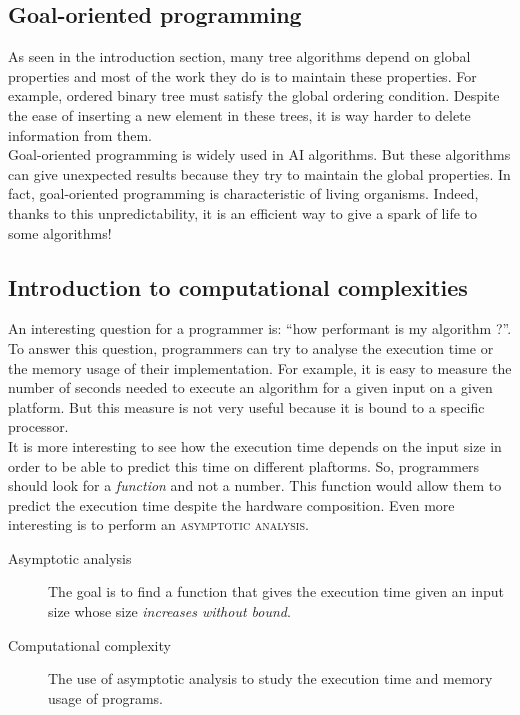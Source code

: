 \documentclass[11pt,a4paper,twoside,openright]{report}
\begin{document}
\subsection{Goal-oriented programming}

As seen in the introduction section, many tree algorithms depend on global 
properties and most of the work they do is to maintain these properties. For 
example, ordered binary tree must satisfy the global ordering condition. 
Despite 
the ease of inserting a new element in these trees, it is way harder to delete 
information from them.\\

Goal-oriented programming is widely used in AI algorithms. But these algorithms 
can give unexpected results because they try to maintain the global properties. 
In fact, goal-oriented programming is characteristic of living organisms. 
Indeed, thanks to this unpredictability, it is an efficient way to give a spark 
of 
life to some algorithms!

\subsection{Introduction to computational complexities}

An interesting question for a programmer is: \enquote{how performant is my 
algorithm ?}. To answer this question, programmers can try to analyse the 
execution time or the memory usage of their implementation. For example, it is 
easy to measure the number of seconds needed to execute an algorithm for a 
given 
input on a given platform. But this measure is not very useful because it is 
bound to a specific processor.\\

It is more interesting to see how the execution time depends on the input size 
in order to be able to predict this time on different plaftorms. So, 
programmers 
should look for a \textit{function} and not a number. This function would allow 
them to predict the execution time despite the hardware composition. Even more 
interesting is to perform an \textsc{asymptotic analysis}.

\begin{description}
	\item[Asymptotic analysis] The goal is to find a function that gives 
the execution time given an input size whose size \textit{increases without 
bound}.
	\item[Computational complexity] The use of asymptotic analysis to study 
the execution time and memory usage of programs.
\end{description}
\end{document}
